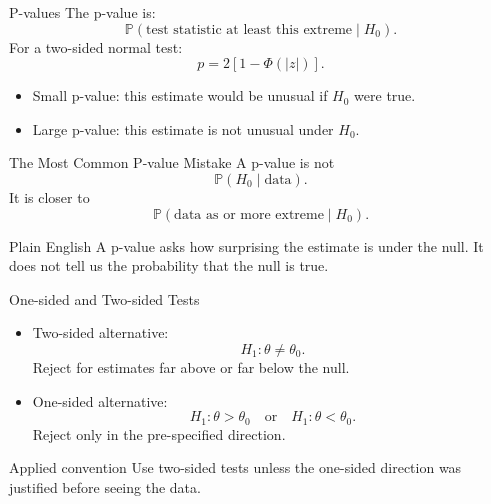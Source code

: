\documentclass[11pt,aspectratio=169]{beamer}
\newcommand{\Prob}{\mathbb{P}}
\newcommand{\derivbutton}[1]{\vspace{0.4em}\hfill\hyperlink{app:#1}{\beamerbutton{Appendix details}}}
\begin{document}
\begin{frame}{P-values}
  \hypertarget{main:pvalue}{}
  The p-value is:
  \[
    \Prob(\text{test statistic at least this extreme}\mid H_0).
  \]
  For a two-sided normal test:
  \[
    p
    =
    2\left[1-\Phi\left(|z|\right)\right].
  \]
  \begin{itemize}
    \item Small p-value: this estimate would be unusual if \(H_0\) were true.
    \item Large p-value: this estimate is not unusual under \(H_0\).
  \end{itemize}
  \derivbutton{pvalue-calc}
\end{frame}

\begin{frame}{The Most Common P-value Mistake}
  A p-value is not
  \[
    \Prob(H_0\mid \text{data}).
  \]
  It is closer to
  \[
    \Prob(\text{data as or more extreme}\mid H_0).
  \]
  \begin{block}{Plain English}
    A p-value asks how surprising the estimate is under the null. It does not tell us the probability that the null is true.
  \end{block}
\end{frame}

\begin{frame}{One-sided and Two-sided Tests}
  \begin{itemize}
    \item Two-sided alternative:
    \[
      H_1:\theta\neq\theta_0.
    \]
    Reject for estimates far above or far below the null.
    \item One-sided alternative:
    \[
      H_1:\theta>\theta_0
      \quad\text{or}\quad
      H_1:\theta<\theta_0.
    \]
    Reject only in the pre-specified direction.
  \end{itemize}
  \begin{block}{Applied convention}
    Use two-sided tests unless the one-sided direction was justified before seeing the data.
  \end{block}
\end{frame}
\end{document}
